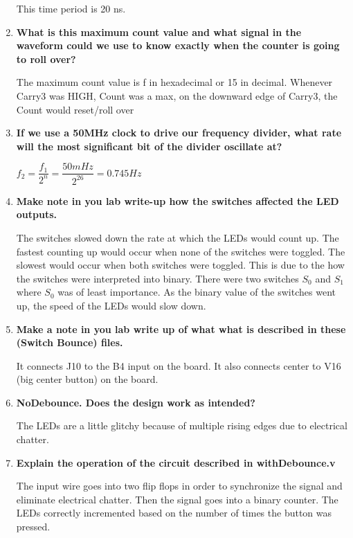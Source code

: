 \documentclass[a4paper,12pt]{article}
\begin{document}
\begin{enumerate}
  This time period is 20 ns.
  
  \item \textbf{What is this maximum count value and what signal in the waveform could we use to know
  exactly when the counter is going to roll over?}
  
  The maximum count value is f in hexadecimal or 15 in decimal. Whenever Carry3 was HIGH, Count was a max, on the downward edge of Carry3, the Count would reset/roll over
  
  \item \textbf{If we use a 50MHz clock to drive our frequency divider, what rate will the most significant bit
  of the divider oscillate at?}
  
  $f_2 = \dfrac{f_1}{2^n} = \dfrac{50 mHz}{2^{26}} = 0.745 Hz$
  
  \item \textbf{Make note in you lab write-up how the switches affected the LED outputs.}
  
  The switches slowed down the rate at which the LEDs would count up. The fastest counting up would occur when none of the switches were toggled. The slowest would occur when both switches were toggled. This is due to the how the switches were interpreted into binary. There were two switches $S_0$ and $S_1$ where $S_0$ was of least importance. As the binary value of the switches went up, the speed of the LEDs would slow down.
  
  \item \textbf{Make a note in you lab write up of what what is described in these (Switch Bounce) files.}
  
  It connects J10 to the B4 input on the board. It also connects center to V16 (big center button) on the board.

  \item \textbf{NoDebounce. Does the design work as intended?}
  
  The LEDs are a little glitchy because of multiple rising edges due to electrical chatter. 
  
  \item \textbf{Explain the operation of the circuit described in withDebounce.v}
  
  The input wire goes into two flip flops in order to synchronize the signal and eliminate electrical chatter. Then the signal goes into a binary counter. The LEDs correctly 
  incremented based on the number of times the button was pressed.     
  
\end{enumerate}
\end{document}
